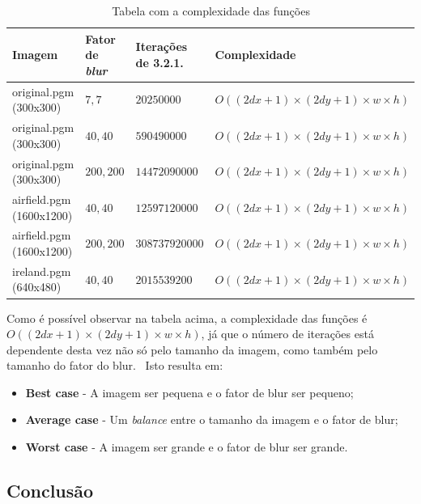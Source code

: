     \begin{table}[H]
        \centering
        \begin{tabular}{| p{23mm} | p{25mm} | p{30mm} | p{38mm} |}
            \hline

            \textbf{Imagem} & \textbf{Fator de \textit{blur}} & \textbf{Iterações de 3.2.1.} & \textbf{Complexidade} \\ \hline

            original.pgm (300x300) & $7,7$ & $20250000$ & $O((2dx + 1) \times (2dy + 1) \times w \times h)$ \\ \hline

            original.pgm (300x300) & $40,40$ & $590490000$ & $O((2dx + 1) \times (2dy + 1) \times w \times h)$ \\ \hline

            original.pgm (300x300) & $200,200$ & $14472090000$ & $O((2dx + 1) \times (2dy + 1) \times w \times h)$ \\ \hline

            airfield.pgm (1600x1200) & $40,40$ & $12597120000$ & $O((2dx + 1) \times (2dy + 1) \times w \times h)$ \\ \hline

            airfield.pgm (1600x1200) & $200,200$ & $308737920000$ & $O((2dx + 1) \times (2dy + 1) \times w \times h)$ \\ \hline

            ireland.pgm (640x480) & $40,40$ & $2015539200$ & $O((2dx + 1) \times (2dy + 1) \times w \times h)$ \\ \hline
        \end{tabular}
        \caption{Tabela com a complexidade das funções}
        \label{tab:complexidade2}
    \end{table}

    \par Como é possível observar na tabela acima, a complexidade das funções é $O((2dx + 1) \times (2dy + 1) \times w \times h)$, já que o número de iterações está dependente desta vez não só pelo tamanho da imagem, como também pelo tamanho do fator do blur. \ Isto resulta em:

    \begin{itemize}
        \item \textbf{Best case} - A imagem ser pequena e o fator de blur ser pequeno;
        \item \textbf{Average case} - Um \textit{balance} entre o tamanho da imagem e o fator de blur;
        \item \textbf{Worst case} - A imagem ser grande e o fator de blur ser grande.
    \end{itemize}

\subsection{Conclusão}
    \par



